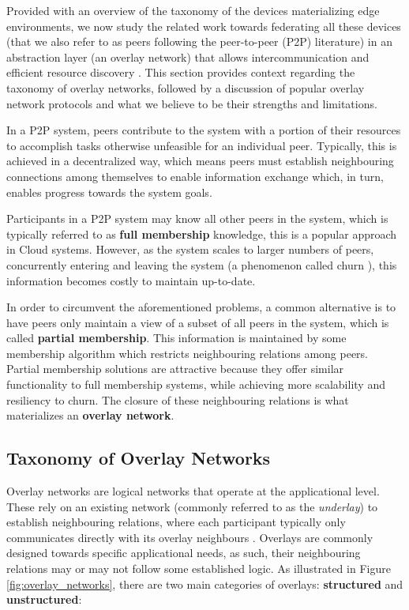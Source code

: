 



Provided with an overview of the taxonomy of the devices materializing edge environments, we now study the related work towards federating all these devices (that we also refer to as peers following the peer-to-peer (P2P) literature) in an abstraction layer (an overlay network) that allows intercommunication and efficient resource discovery \cite{leitaoPHDthesis}. This section provides context regarding the taxonomy of overlay networks, followed by a discussion of popular overlay network protocols and what we believe to be their strengths and limitations.

In a P2P system, peers contribute to the system with a portion of their resources to accomplish tasks otherwise unfeasible for an individual peer. Typically, this is achieved in a decentralized way, which means peers must establish neighbouring connections among themselves to enable information exchange which, in turn, enables progress towards the system goals. 

Participants in a P2P system may know all other peers in the system, which is typically referred to as \textbf{full membership} knowledge, this is a popular approach in Cloud systems. However, as the system scales to larger numbers of peers, concurrently entering and leaving the system (a phenomenon called churn \cite{stutzbach2006understanding}), this information becomes costly to maintain up-to-date. 

In order to circumvent the aforementioned problems, a common alternative is to have peers only maintain a view of a subset of all peers in the system, which is called \textbf{partial membership}. This information is maintained by some membership algorithm which restricts neighbouring relations among peers. Partial membership solutions are attractive because they offer similar functionality to full membership systems, while achieving more scalability and resiliency to churn. The closure of these neighbouring relations is what materializes an \textbf{overlay network}.

\subsection{Taxonomy of Overlay Networks}

Overlay networks are logical networks that operate at the applicational level. These rely on an existing network (commonly referred to as the \textit{underlay}) to establish neighbouring relations, where each participant typically only communicates directly with its overlay neighbours \cite{leitaoPHDthesis}. Overlays are commonly designed towards specific applicational needs, as such, their neighbouring relations may or may not follow some  established logic. As illustrated in Figure \ref{fig:overlay_networks}, there are two main categories of overlays: \textbf{structured} and \textbf{unstructured}:

